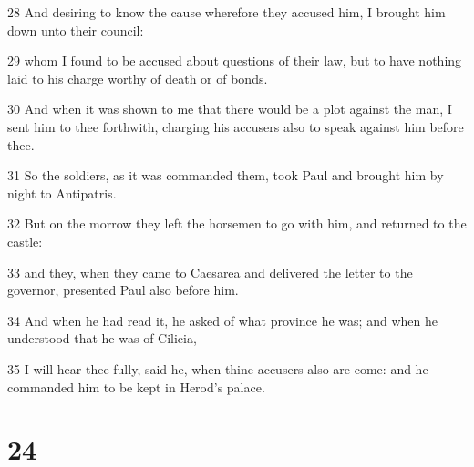 \par 28 And desiring to know the cause wherefore they accused him, I brought him down unto their council:
\par 29 whom I found to be accused about questions of their law, but to have nothing laid to his charge worthy of death or of bonds.
\par 30 And when it was shown to me that there would be a plot against the man, I sent him to thee forthwith, charging his accusers also to speak against him before thee.
\par 31 So the soldiers, as it was commanded them, took Paul and brought him by night to Antipatris.
\par 32 But on the morrow they left the horsemen to go with him, and returned to the castle:
\par 33 and they, when they came to Caesarea and delivered the letter to the governor, presented Paul also before him.
\par 34 And when he had read it, he asked of what province he was; and when he understood that he was of Cilicia,
\par 35 I will hear thee fully, said he, when thine accusers also are come: and he commanded him to be kept in Herod's palace.

\chapter{24}

